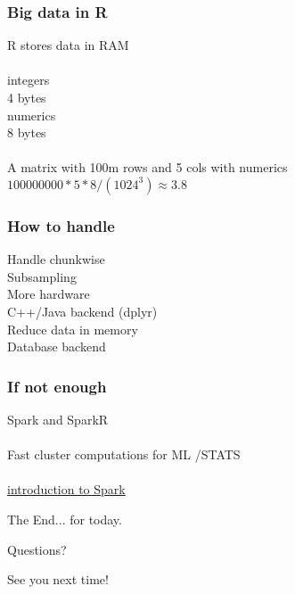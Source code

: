 \documentclass{beamer}
\begin{document}
\begin{frame}
	\frametitle{Big data in R}
	\begin{center}
		R stores data in RAM\\~\\
		integers\\
		4 bytes\\
		numerics\\
		8 bytes\\~\\
		A matrix with 100m rows and 5 cols with numerics \\
		$100000000 * 5 * 8 / (1024^3) \approx 3.8$
	\end{center}
\end{frame}

\begin{frame}
	\frametitle{How to handle}
	\begin{center}
		Handle chunkwise\\
		Subsampling\\
		More hardware\\
		C++/Java backend (dplyr)\\
		Reduce data in memory\\
		Database backend\\
	\end{center}
\end{frame}

\begin{frame}
	\frametitle{If not enough}
	\begin{center}
		Spark and SparkR\\~\\
		Fast cluster computations  for ML /STATS\\~\\
		\href{https://www.youtube.com/watch?v=_Ss1Cm6WO-I}
		{introduction to Spark}	\\
	\end{center}
\end{frame}


\begin{frame}
\Huge{\centerline{The End... for today.}}
\Huge{\centerline{Questions?}}
\Huge{\centerline{See you next time!}}
\end{frame}

\end{document}
